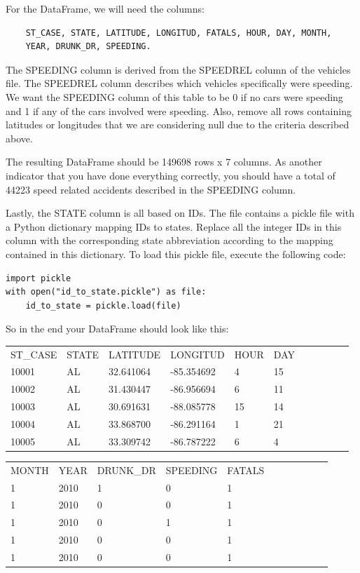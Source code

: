 \begin{problem}
For the  DataFrame, we will need the columns:
\begin{lstlisting}
    ST_CASE, STATE, LATITUDE, LONGITUD, FATALS, HOUR, DAY, MONTH,
    YEAR, DRUNK_DR, SPEEDING.
\end{lstlisting}

The SPEEDING column is derived from
the SPEEDREL column of the vehicles file. The SPEEDREL column describes
which vehicles specifically were speeding. We want the SPEEDING column of this
table to be 0 if no cars were speeding and 1 if any of the cars involved were
speeding. Also, remove all rows containing latitudes or longitudes that we are
considering null due to the criteria described above.

The resulting DataFrame should be 149698 rows x 7 columns. As
another indicator that you have done everything correctly, you should have a total
of 44223 speed related accidents described in the SPEEDING column.

Lastly, the STATE column is all based on IDs. The  file
contains a pickle file with a Python dictionary mapping IDs to states. Replace
all the integer IDs in this column with the corresponding state abbreviation
according to the mapping contained in this dictionary. To load this pickle file,
execute the following code:
\begin{lstlisting}
import pickle
with open("id_to_state.pickle") as file:
    id_to_state = pickle.load(file)
\end{lstlisting}

So in the end your DataFrame should look like this:

\label{my-label}
\begin{tabular}{lllllllllll}
ST\_CASE & STATE & LATITUDE  & LONGITUD   & HOUR & DAY \\
10001    & AL    & 32.641064 & -85.354692 & 4    & 15 \\
10002    & AL    & 31.430447 & -86.956694 & 6    & 11 \\
10003    & AL    & 30.691631 & -88.085778 & 15   & 14 \\
10004    & AL    & 33.868700 & -86.291164 & 1    & 21 \\
10005    & AL    & 33.309742 & -86.787222 & 6    & 4
\end{tabular}

\label{my-label}
\begin{tabular}{lllllllllll}
MONTH & YEAR & DRUNK\_DR & SPEEDING & FATALS \\
1     & 2010 & 1         & 0        & 1      \\
1     & 2010 & 0         & 0        & 1      \\
1     & 2010 & 0         & 1        & 1      \\
1     & 2010 & 0         & 0        & 1      \\
1     & 2010 & 0         & 0        & 1
\end{tabular}


\end{problem}
